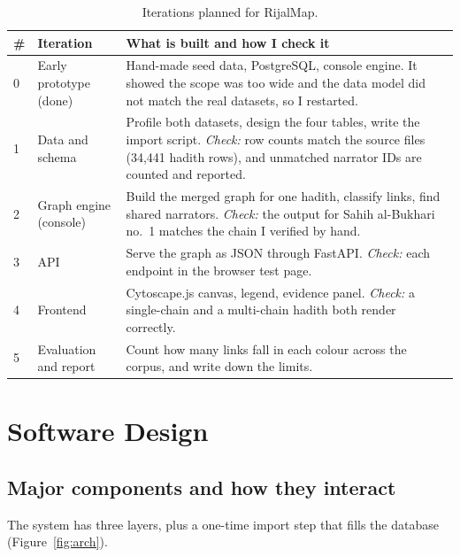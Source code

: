 \documentclass[11pt,a4paper]{article}
\begin{document}
\begin{table}[H]
\centering
\small
\begin{tabularx}{\textwidth}{@{}p{0.5cm}p{3.6cm}X@{}}
\toprule
\textbf{\#} & \textbf{Iteration} & \textbf{What is built and how I check it} \\
\midrule
0 & Early prototype (done) & Hand-made seed data, PostgreSQL, console engine. It showed the scope was too wide and the data model did not match the real datasets, so I restarted. \\
1 & Data and schema & Profile both datasets, design the four tables, write the import script. \emph{Check:} row counts match the source files (34,441 hadith rows), and unmatched narrator IDs are counted and reported. \\
2 & Graph engine (console) & Build the merged graph for one hadith, classify links, find shared narrators. \emph{Check:} the output for Sahih al-Bukhari no.~1 matches the chain I verified by hand. \\
3 & API & Serve the graph as JSON through FastAPI. \emph{Check:} each endpoint in the browser test page. \\
4 & Frontend & Cytoscape.js canvas, legend, evidence panel. \emph{Check:} a single-chain and a multi-chain hadith both render correctly. \\
5 & Evaluation and report & Count how many links fall in each colour across the corpus, and write down the limits. \\
\bottomrule
\end{tabularx}
\caption{Iterations planned for RijalMap.}
\end{table}

\section{Software Design}
\subsection{Major components and how they interact}
The system has three layers, plus a one-time import step that fills the database (Figure~\ref{fig:arch}).
\end{document}
